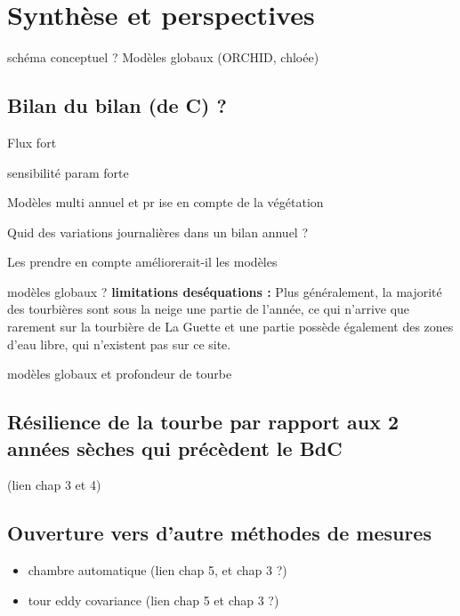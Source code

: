 \chapter*{Synthèse et perspectives}
\newpage

schéma conceptuel ? Modèles globaux (ORCHID, chloée)

\section{Bilan du bilan (de C) ?}

Flux fort

sensibilité param forte

Modèles multi annuel et pr ise en compte de la végétation

Quid des variations journalières dans un bilan annuel ? 

Les prendre en compte améliorerait-il les modèles

modèles globaux ?
\textbf{limitations deséquations :}
Plus généralement, la majorité des tourbières sont sous la neige une partie de l'année, ce qui n'arrive que rarement sur la tourbière de La Guette et une partie possède également des zones d'eau libre, qui n'existent pas sur ce site.

modèles globaux et profondeur de tourbe

\section{Résilience de la tourbe par rapport aux 2 années sèches qui précèdent le BdC}
(lien chap 3 et 4)

\section{Ouverture vers d'autre méthodes de mesures}
\begin{itemize}
\item chambre automatique (lien chap 5, et chap 3 ?)
\item tour eddy covariance (lien chap 5 et chap 3 ?)
\end{itemize}
